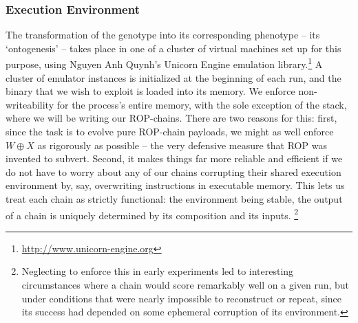 \subsubsection{Execution Environment}
The transformation of the genotype into its corresponding
phenotype -- its `ontogenesis' -- takes place in one of a cluster
of virtual machines set up for this purpose, using Nguyen Anh Quynh's Unicorn Engine emulation library.\footnote{\url{http://www.unicorn-engine.org}} A cluster of
emulator instances is initialized at the beginning of each run,
and the binary that we wish to exploit is loaded into its memory.
We enforce non-writeability for the process's entire memory, with
the sole exception of the stack, where we will be writing our
ROP-chains. There are two reasons for this: first, since
the task is to evolve pure ROP-chain payloads, we might
as well enforce $W \oplus X$ as rigorously as possible -- the
very defensive measure that ROP was invented to subvert.
Second, it makes things far more reliable and efficient if we
do not have to worry about any of our chains corrupting their
shared execution environment by, say, overwriting instructions in
executable memory. This lets us treat each chain as strictly
functional: the environment being stable, the output of a chain
is uniquely determined by its composition and its inputs.%
\footnote{Neglecting to enforce this in early experiments led to
  interesting circumstances where a chain would score remarkably
  well on a given run, but under conditions that were nearly
  impossible to reconstruct or repeat, since its success had
  depended on some ephemeral corruption of its environment.}

